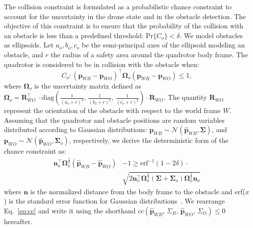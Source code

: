 The collision constraint is formulated as a probabilistic chance constraint to account for the uncertainty in the drone state and in the obstacle detection. The objective of this constraint is to ensure that the probability of the collision with an obstacle is less than a predefined threshold: $\text{Pr}\{C_{o}\} < \delta$. We model obstacles as ellipsoids. Let $a_{o}, b_{o}, c_{o}$ be the semi-principal axes of the ellipsoid modeling an obstacle, and $r$ the radius of a safety area around the quadrotor body frame. The quadrotor is considered to be in collision with the obstacle when:
\begin{equation}\label{eq:collision_condition}
C_{o} : \left(\mathbf{p}_{WB} - \mathbf{p}_{WO}\right)^\intercal\bm{\Omega}_{o}\left(\mathbf{p}_{WB} - \mathbf{p}_{WO}\right) \leq 1,
\end{equation}%
where $\bm{\Omega}_{o}$ is the uncertainty matrix defined as $\bm{\Omega}_{o} = \mathbf{R}_{WO}^\intercal\ \cdot \text{diag}\left(\frac{1}{\left(a_{o} + r\right)^2}, \, \frac{1}{\left(b_{o} + r\right)^2}, \, \frac{1}{\left(c_{o} + r\right)^2}\right) \cdot \mathbf{R}_{WO}$. The quantity  $\mathbf{R}_{WO}$ represent the  orientation of the obstacle with respect to the world frame $W$. Assuming that the quadrotor and obstacle positions are random variables distributed according to Gaussian distributions: $\mathbf{p}_{WB}\sim\mathcal{N}(\hat{\mathbf{p}}_{WB}, \bm{\Sigma})$, and $\mathbf{p}_{WO}\sim\mathcal{N}(\hat{\mathbf{p}}_{WO}, \bm{\Sigma}_{o})$, respectively, we derive the deterministic form of the chance constraint as:
%
\begin{align}\label{eq:cc}
    \bm{n}_o^\intercal \bm{\Omega}_{o}^{\frac{1}{2}}(\hat{\bm{p}}_{WB} - \hat{\bm{p}}_{WO}) &- 1 \geq \text{erf}^{-1}(1-2\delta) \cdot \nonumber \\&
    \sqrt{2\bm{n}_o^\intercal \bm{\Omega}_{o}^{\frac{1}{2}} (\bm{\Sigma} + \bm{\Sigma}_o)\bm{\Omega}_{o}^{\frac{1}{2}} \bm{n}_o}
\end{align}
%
where $\bm{n}$ is the normalized distance from the body frame to the obstacle and erf($x$) is the standard error function for Gaussian distributions~\cite{Barfoot15book}. We rearrange Eq.~\ref{eq:cc} and write it using the shorthand $cc(\hat{\bm{p}}_{WB}, \, \Sigma_{B}, \, \hat{\bm{p}}_{WO}, \, \Sigma_{O}) \leq  0$ hereafter.

